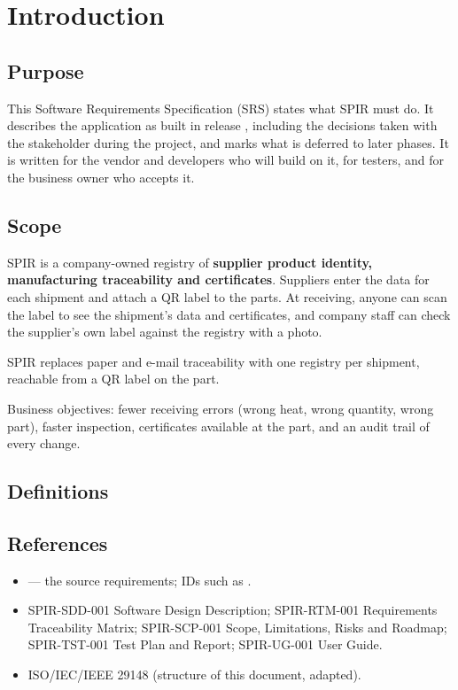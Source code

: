 \documentclass[11pt,a4paper]{article}
\begin{document}
\DocumentControl
\tableofcontents
\clearpage

\section{Introduction}
\subsection{Purpose}
This Software Requirements Specification (SRS) states what SPIR must do. It describes the application as built in
release \SPIRRelease, including the decisions taken with the stakeholder during the project, and marks what is
deferred to later phases. It is written for the vendor and developers who will build on it, for testers, and for the
business owner who accepts it.

\subsection{Scope}
SPIR is a company-owned registry of \textbf{supplier product identity, manufacturing traceability and certificates}.
Suppliers enter the data for each shipment and attach a QR label to the parts. At receiving, anyone can scan the label
to see the shipment's data and certificates, and company staff can check the supplier's own label against the
registry with a photo.

\begin{keypoint}
SPIR replaces paper and e-mail traceability with one registry per shipment, reachable from a QR label on the part.
\end{keypoint}

Business objectives: fewer receiving errors (wrong heat, wrong quantity, wrong part), faster inspection, certificates
available at the part, and an audit trail of every change.

\subsection{Definitions}


\subsection{References}
\begin{itemize}
  \item \emph{\SPIRSpec} --- the source requirements; IDs such as .
  \item SPIR-SDD-001 Software Design Description; SPIR-RTM-001 Requirements Traceability Matrix; SPIR-SCP-001 Scope,
    Limitations, Risks and Roadmap; SPIR-TST-001 Test Plan and Report; SPIR-UG-001 User Guide.
  \item ISO/IEC/IEEE 29148 (structure of this document, adapted).
\end{itemize}
\end{document}
